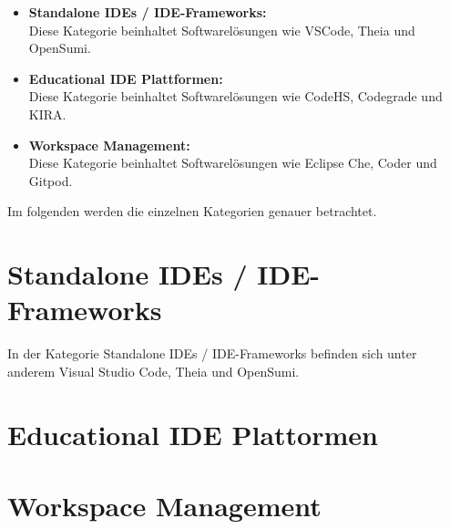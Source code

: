 \begin{itemize}
    \item \textbf{Standalone IDEs / IDE-Frameworks:} \\ Diese Kategorie beinhaltet Softwarelösungen wie VSCode, Theia und OpenSumi.
    \item \textbf{Educational IDE Plattformen:} \\ Diese Kategorie beinhaltet Softwarelösungen wie CodeHS, Codegrade und KIRA.
    \item \textbf{Workspace Management:} \\ Diese Kategorie beinhaltet Softwarelösungen wie Eclipse Che, Coder und Gitpod.
\end{itemize}

Im folgenden werden die einzelnen Kategorien genauer betrachtet.

\section{Standalone IDEs / IDE-Frameworks}
In der Kategorie Standalone IDEs / IDE-Frameworks befinden sich unter anderem Visual Studio Code, Theia und OpenSumi.

\section{Educational IDE Plattormen}


\section{Workspace Management}
